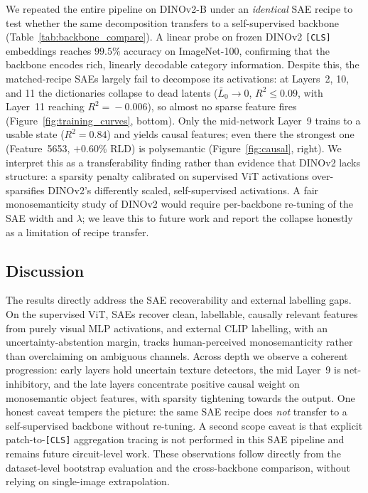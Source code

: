 We repeated the entire pipeline on DINOv2-B \cite{Caron2021} under an \emph{identical} SAE recipe to test whether the same decomposition transfers to a self-supervised backbone (Table~\ref{tab:backbone_compare}). A linear probe on frozen DINOv2 \texttt{[CLS]} embeddings reaches $99.5\%$ accuracy on ImageNet-100, confirming that the backbone encodes rich, linearly decodable category information. Despite this, the matched-recipe SAEs largely fail to decompose its activations: at Layers~2, 10, and 11 the dictionaries collapse to dead latents ($\bar{L}_0\!\to\!0$, $R^2\!\le\!0.09$, with Layer~11 reaching $R^2\!=\!-0.006$), so almost no sparse feature fires (Figure~\ref{fig:training_curves}, bottom). Only the mid-network Layer~9 trains to a usable state ($R^2=0.84$) and yields causal features; even there the strongest one (Feature~5653, $+0.60\%$ RLD) is polysemantic (Figure~\ref{fig:causal}, right). We interpret this as a transferability finding rather than evidence that DINOv2 lacks structure: a sparsity penalty calibrated on supervised ViT activations over-sparsifies DINOv2's differently scaled, self-supervised activations. A fair monosemanticity study of DINOv2 would require per-backbone re-tuning of the SAE width and $\lambda$; we leave this to future work and report the collapse honestly as a limitation of recipe transfer.

\subsection{Discussion}

The results directly address the SAE recoverability and external labelling gaps. On the supervised ViT, SAEs recover clean, labellable, causally relevant features from purely visual MLP activations, and external CLIP labelling, with an uncertainty-abstention margin, tracks human-perceived monosemanticity rather than overclaiming on ambiguous channels. Across depth we observe a coherent progression: early layers hold uncertain texture detectors, the mid Layer~9 is net-inhibitory, and the late layers concentrate positive causal weight on monosemantic object features, with sparsity tightening towards the output. One honest caveat tempers the picture: the same SAE recipe does \emph{not} transfer to a self-supervised backbone without re-tuning. A second scope caveat is that explicit patch-to-\texttt{[CLS]} aggregation tracing is not performed in this SAE pipeline and remains future circuit-level work. These observations follow directly from the dataset-level bootstrap evaluation and the cross-backbone comparison, without relying on single-image extrapolation.
